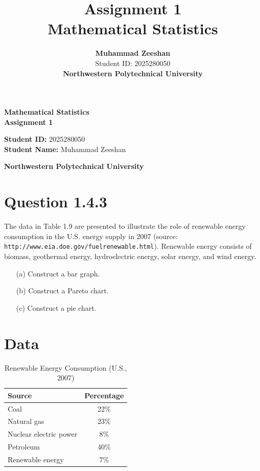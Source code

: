 \documentclass[12pt]{article}
\title{\vspace{3cm}\textbf{Assignment 1}\\[0.5cm]
\large Mathematical Statistics}
\author{\textbf{Muhammad Zeeshan}\\[0.2cm]
Student ID: 2025280050\\[1cm]
\textbf{Northwestern Polytechnical University}}
\date{}
\begin{document}
\begin{titlepage}
    \centering
    \vspace*{3cm}
    {\Huge \textbf{Mathematical Statistics}}\\[0.8cm]
    {\Large \textbf{Assignment 1}}\\[3cm]

    \begin{flushleft}
    \textbf{Student ID:} 2025280050\\
    \textbf{Student Name:} Muhammad Zeeshan\\[0.5cm]
    \end{flushleft}

    \vfill
    \begin{center}
    {\Large \textbf{Northwestern Polytechnical University}}
    \end{center}
\end{titlepage}

\section*{Question 1.4.3}
The data in Table 1.9 are presented to illustrate the role of renewable energy consumption in the U.S. energy supply in 2007 (source: \texttt{http://www.eia.doe.gov/fuelrenewable.html}). Renewable energy consists of biomass, geothermal energy, hydroelectric energy, solar energy, and wind energy.

\begin{itemize}
    \item[(a)] Construct a bar graph.  
    \item[(b)] Construct a Pareto chart.  
    \item[(c)] Construct a pie chart.
\end{itemize}

\section*{Data}
\begin{table}[H]
\centering
\caption{Renewable Energy Consumption (U.S., 2007)}
\begin{tabular}{|l|c|}
\hline
\textbf{Source} & \textbf{Percentage} \\
\hline
Coal & 22\% \\
Natural gas & 23\% \\
Nuclear electric power & 8\% \\
Petroleum & 40\% \\
Renewable energy & 7\% \\
\hline
\end{tabular}
\end{table}
\end{document}
